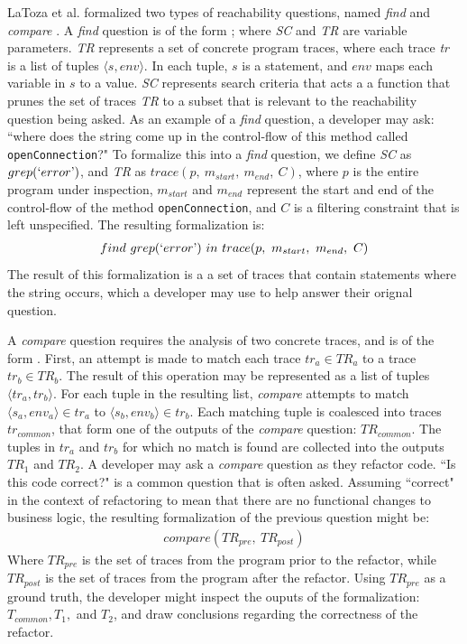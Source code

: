 \noindent LaToza et al. formalized two types of reachability questions, named
\textit{find} and \textit{compare} \cite{latoza-2010-reach}.
A \textit{find} question is of the form \findq{}; where \textit{SC} and
\textit{TR} are variable parameters.
\textit{TR} represents a set of concrete program traces, where each trace 
\textit{tr} is a list of tuples $\langle s, env \rangle$. 
In each tuple, $s$ is a statement, and $env$ maps each variable in $s$ to a
value.
\textit{SC} represents search criteria that acts a a function that prunes the
set of traces \textit{TR} to a subset that is relevant to the reachability
question being asked.
As an example of a \textit{find} question, a developer may ask: ``where does
the string  come up in the control-flow of this method called 
\texttt{openConnection}?"
To formalize this into a \textit{find} question, we define \textit{SC} as
$grep(`error\textrm')$, and \textit{TR} as 
$trace(p, \ m_{start}, \ m_{end}, \ C)$, where $p$ is the entire program under
inspection, $m_{start}$ and $m_{end}$ represent the start and end of the
control-flow of the method \texttt{openConnection}, and $C$ is a filtering
constraint that is left unspecified.
The resulting formalization is:
\begin{align*}
  find \ grep(`error\textrm') \ in \ trace(p, \ m_{start}, \ m_{end}, \ C)
\end{align*}
The result of this formalization is a a set of traces that contain statements
where the string  occurs, which a developer may use to help answer
their orignal question.

\par A \textit{compare} question requires the analysis of two concrete traces, 
and is of the form \compareq{}. 
First, an attempt is made to match each trace $tr_a \in TR_a$ to a trace 
$tr_b \in TR_b$.
The result of this operation may be represented as a list of tuples 
$\langle tr_a, tr_b \rangle$.
For each tuple in the resulting list, \textit{compare} attempts to match 
$\langle s_a, env_a\rangle \in tr_a$ to $\langle s_b, env_b \rangle \in tr_b$.
Each matching tuple is coalesced into traces $tr_{common}$, that form one
of the outputs of the \textit{compare} question: $TR_{common}$.
The tuples in $tr_a$ and $tr_b$ for which no match is found are collected into
the outputs $TR_1$ and $TR_2$.
A developer may ask a \textit{compare} question as they refactor code.
``Is this code correct?" \cite{latoza-2010-hard-questions} is a common
question that is often asked.
Assuming ``correct" in the context of refactoring to mean that there are no
functional changes to business logic, the resulting formalization of the
previous question might be:
\begin{align*}
  compare(TR_{pre}, \ TR_{post})
\end{align*}
Where $TR_{pre}$ is the set of traces from the program prior to the refactor,
while $TR_{post}$ is the set of traces from the program after the refactor.
Using $TR_{pre}$ as a ground truth, the developer might inspect the ouputs
of the formalization: $T_{common}, T_1,$ and $T_2$, and draw conclusions
regarding the correctness of the refactor.

